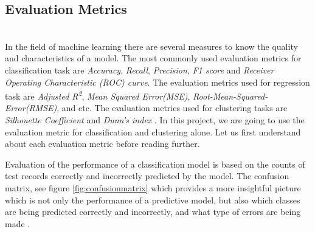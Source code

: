 \documentclass[format=sigconf]{acmart}
\begin{document}
\subsection{Evaluation Metrics}
\hfill\\
In the field of machine learning there are several measures to know the quality and characteristics of a model. The most commonly used
evaluation metrics for classification task are \textit{Accuracy}, \textit{Recall}, \textit{Precision}, \textit{F1 score} and 
\textit{Receiver Operating Characteristic (ROC) curve}. The evaluation metrics used for regression task are 
\textit{Adjusted R\textsuperscript{2}}, \textit{Mean Squared Error(MSE)}, \textit{Root-Mean-Squared-Error(RMSE)}, and etc. 
The evaluation metrics used for clustering tasks are \textit{Silhouette Coefficient} and \textit{Dunn's index} 
\cite{powers2020evaluation}. In this project, we are going to use the evaluation metric for classification and clustering alone. 
Let us first understand about each evaluation metric before reading further.

Evaluation of the performance of a classification model is based on the counts of test records correctly and incorrectly predicted 
by the model. The confusion matrix, see figure \ref{fig:confusionmatrix} which provides a more insightful picture which is not only the 
performance of a predictive model, but also which classes are being predicted correctly and incorrectly, and what type of errors 
are being made \cite{confusionmatrix}.
\end{document}
